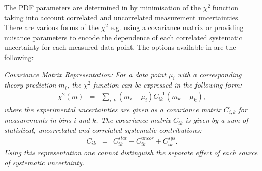 The PDF parameters are determined in \fitter by minimisation of the
$\chi^2$ function taking into account correlated and uncorrelated measurement uncertainties.
There are various forms of the $\chi^2$ 
e.g. using a covariance matrix or providing nuisance parameters to encode the dependence of 
each correlated systematic uncertainty for each measured data point.
The options available in \fitter are the following:

\begin{description}
\item \it {Covariance Matrix Representation:} \rm
For a data point $\mu_i$ with a corresponding theory prediction $m_i$, 
the $\chi^2$ function 
can be expressed in the following form:
%
\begin{eqnarray}
\chi^2 (m)& = & \sum_{i,k}(m_i-\mu_i)C^{-1}_{ik}(m_k-\mu_k),
\end{eqnarray}
where the experimental uncertainties are given as a covariance matrix $C_{i,k}$ for measurements in bins $i$ and $k$.
The covariance matrix $C_{ik}$ is given by a sum of statistical, uncorrelated and correlated systematic contributions: 
\begin{eqnarray}
C_{ik}& = & C^{stat}_{ik}+C^{uncor}_{ik}+C^{sys}_{ik}.
\end{eqnarray}
Using this representation one cannot distinguish the separate effect of each source of systematic uncertainty. 
\\


\end{description}
